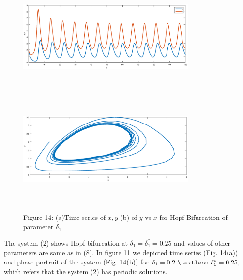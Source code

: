 \documentclass[a4paper, 10pt]{article}
\begin{document}
\begin{figure}[H]
	{\includegraphics[width=9cm, height=6cm]{21a.eps}}
	\endminipage\hfill
	{\includegraphics[width=9cm, height=6cm]{21b.eps}}
	\endminipage\hfill
	\begin{center} Figure 14: (a)Time series of $x,y$  (b)  of $y$ vs $x$ for Hopf-Bifurcation of parameter $\delta_1$   \end{center}
\end{figure}
The system (2) shows Hopf-bifurcation at $\delta_1=\delta_1^*=0.25$ and values of other parameters are same as in (8). In figure 11 we depicted time series (Fig. 14(a)) and phase portrait of the system (Fig. 14(b)) for $\delta_1=0.2~\textless~\delta_1^*=0.25,$ which refers that the system (2) has periodic solutions.
\end{document}

